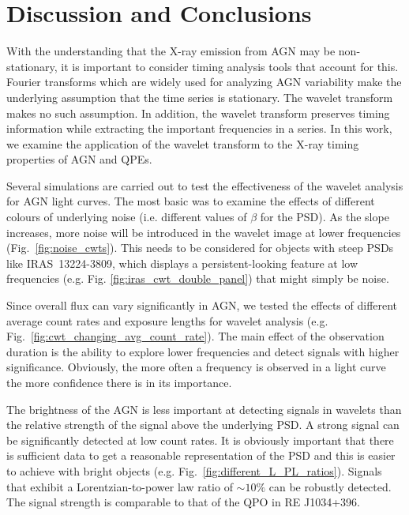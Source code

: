 \documentclass[fleqn,usenatbib]{mnras}
\begin{document}
\section{Discussion and Conclusions}


With the understanding that the X-ray emission from AGN may be non-stationary, it is important to consider timing analysis tools that account for this. Fourier transforms which are widely used for analyzing AGN variability make the underlying assumption that the time series is stationary. The wavelet transform makes no such assumption.  In addition, the wavelet transform preserves timing information while extracting the important frequencies in a series. In this work, we examine the application of the wavelet transform to the X-ray timing properties of AGN and QPEs.



Several simulations are carried out to test the effectiveness of the wavelet analysis for AGN light curves.   The most basic was to examine the effects of different colours of underlying noise (i.e. different values of $\beta$ for the PSD). As the slope increases, more noise will be introduced in the wavelet image at lower frequencies (Fig.~\ref{fig:noise_cwts}).  This needs to be considered for objects with steep PSDs like IRAS~13224-3809, which displays a persistent-looking feature at low frequencies (e.g. Fig. \ref{fig:iras_cwt_double_panel}) that might simply be noise.


Since overall flux can vary significantly in AGN, we tested the effects of different average count rates and exposure lengths for wavelet analysis (e.g. Fig.~\ref{fig:cwt_changing_avg_count_rate}).  The main effect of the observation duration is the ability to explore lower frequencies and detect signals with higher significance.  Obviously, the more often a frequency is observed in a light curve the more confidence there is in its importance.  

The brightness of the AGN is less important at detecting signals in wavelets than the relative strength of the signal above the underlying PSD.  A strong signal can be significantly detected at low count rates.  It is obviously important that there is sufficient data to get a reasonable representation of the PSD and this is easier to achieve with bright objects (e.g. Fig.~\ref{fig:different_L_PL_ratios}).  Signals that exhibit a Lorentzian-to-power law ratio of $\sim 10\%$ can be robustly detected.  The signal strength is comparable to that of the QPO in RE J1034+396.
\end{document}
